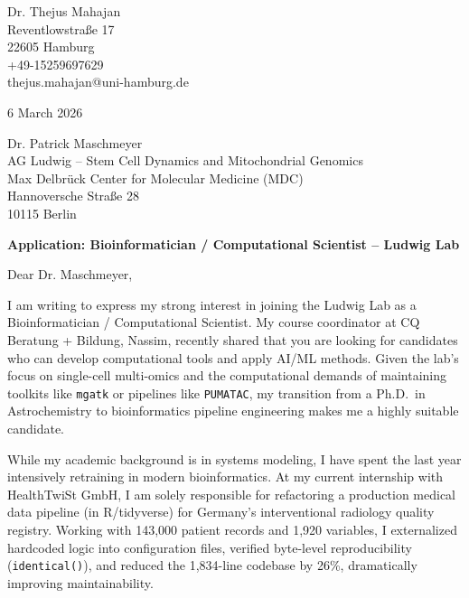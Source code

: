 \documentclass[10pt,a4paper]{article}
\begin{document}
\pagestyle{empty}

\begin{flushleft}
Dr. Thejus Mahajan\\
Reventlowstra{\ss}e 17\\
22605 Hamburg\\
+49-15259697629\\
thejus.mahajan@uni-hamburg.de
\end{flushleft}

\vspace{0.3cm}

\begin{flushleft}
6 March 2026
\end{flushleft}

\vspace{0.3cm}

\begin{flushleft}
Dr. Patrick Maschmeyer\\
AG Ludwig -- Stem Cell Dynamics and Mitochondrial Genomics\\
Max Delbr\"uck Center for Molecular Medicine (MDC)\\
Hannoversche Stra{\ss}e 28\\
10115 Berlin
\end{flushleft}

\vspace{0.3cm}

\textbf{Application: Bioinformatician / Computational Scientist -- Ludwig Lab}

\vspace{0.5cm}

Dear Dr. Maschmeyer,

I am writing to express my strong interest in joining the Ludwig Lab as a Bioinformatician / Computational Scientist. My course coordinator at CQ Beratung + Bildung, Nassim, recently shared that you are looking for candidates who can develop computational tools and apply AI/ML methods. Given the lab's focus on single-cell multi-omics and the computational demands of maintaining toolkits like \texttt{mgatk} or pipelines like \texttt{PUMATAC}, my transition from a Ph.D.\ in Astrochemistry to bioinformatics pipeline engineering makes me a highly suitable candidate.

While my academic background is in systems modeling, I have spent the last year intensively retraining in modern bioinformatics. At my current internship with HealthTwiSt GmbH, I am solely responsible for refactoring a production medical data pipeline (in R/tidyverse) for Germany's interventional radiology quality registry. Working with 143,000 patient records and 1,920 variables, I externalized hardcoded logic into configuration files, verified byte-level reproducibility (\texttt{identical()}), and reduced the 1,834-line codebase by 26\%, dramatically improving maintainability.
\end{document}
